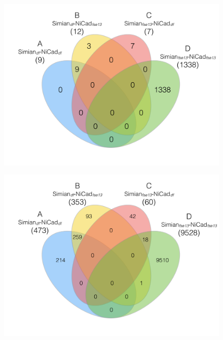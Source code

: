 \documentclass{IEEEtran}
\begin{document}
\begin{figure}
	\centering
	\begin{minipage}{.5\textwidth}
		\centering
		\includegraphics[width=0.7\linewidth]{venn4_pairs_good}
		\label{fig:venn4_orig_good}
	\end{minipage}%
	\begin{minipage}{.5\textwidth}
		\centering
		\includegraphics[width=0.7\linewidth]{venn4_pairs_ok}
		\label{fig:venn4_orig_ok}
	\end{minipage}
\end{figure}
%
\end{document}
